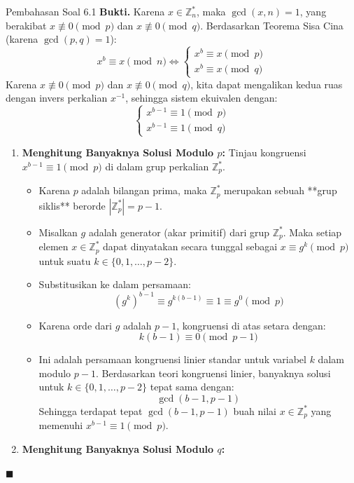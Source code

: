 \documentclass[11pt,a4paper]{article}
\newenvironment{proof}{\noindent\textbf{Bukti.}}{\hfill$\blacksquare$\vspace{0.3em}}
\begin{document}
\begin{solusibox}{Pembahasan Soal 6.1}
\begin{proof}
Karena $x \in \mathbb{Z}_n^*$, maka $\gcd(x, n) = 1$, yang berakibat $x \not\equiv 0 \pmod p$ dan $x \not\equiv 0 \pmod q$.
Berdasarkan Teorema Sisa Cina (karena $\gcd(p, q) = 1$):
\[
x^b \equiv x \pmod n \iff
\begin{cases}
x^b \equiv x \pmod p \\
x^b \equiv x \pmod q
\end{cases}
\]
Karena $x \not\equiv 0 \pmod p$ dan $x \not\equiv 0 \pmod q$, kita dapat mengalikan kedua ruas dengan invers perkalian $x^{-1}$, sehingga sistem ekuivalen dengan:
\[
\begin{cases}
x^{b-1} \equiv 1 \pmod p \\
x^{b-1} \equiv 1 \pmod q
\end{cases}
\]
\begin{enumerate}[leftmargin=*]
    \item \textbf{Menghitung Banyaknya Solusi Modulo $p$:}
    Tinjau kongruensi $x^{b-1} \equiv 1 \pmod p$ di dalam grup perkalian $\mathbb{Z}_p^*$.
    \begin{itemize}
        \item Karena $p$ adalah bilangan prima, maka $\mathbb{Z}_p^*$ merupakan sebuah **grup siklis** berorde $|\mathbb{Z}_p^*| = p - 1$.
        \item Misalkan $g$ adalah generator (akar primitif) dari grup $\mathbb{Z}_p^*$. Maka setiap elemen $x \in \mathbb{Z}_p^*$ dapat dinyatakan secara tunggal sebagai $x \equiv g^k \pmod p$ untuk suatu $k \in \{0, 1, \dots, p - 2\}$.
        \item Substitusikan ke dalam persamaan:
        \[
        (g^k)^{b-1} \equiv g^{k(b-1)} \equiv 1 \equiv g^0 \pmod p
        \]
        \item Karena orde dari $g$ adalah $p - 1$, kongruensi di atas setara dengan:
        \[
        k(b - 1) \equiv 0 \pmod{p - 1}
        \]
        \item Ini adalah persamaan kongruensi linier standar untuk variabel $k$ dalam modulo $p - 1$. Berdasarkan teori kongruensi linier, banyaknya solusi untuk $k \in \{0, 1, \dots, p - 2\}$ tepat sama dengan:
        \[
        \gcd(b - 1, p - 1)
        \]
        Sehingga terdapat tepat $\gcd(b - 1, p - 1)$ buah nilai $x \in \mathbb{Z}_p^*$ yang memenuhi $x^{b-1} \equiv 1 \pmod p$.
    \end{itemize}
    \item \textbf{Menghitung Banyaknya Solusi Modulo $q$:}

\end{enumerate}
\end{proof}
\end{solusibox}
\end{document}
